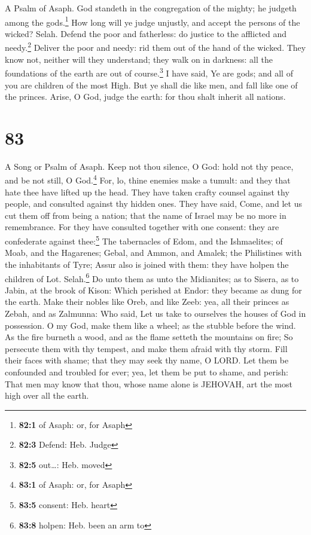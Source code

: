 A Psalm of Asaph.  God standeth in the congregation of the
mighty; he judgeth among the gods.\footnote{\textbf{82:1} of Asaph: or,
  for Asaph}  How long will ye judge unjustly, and accept
the persons of the wicked? Selah.  Defend the poor and
fatherless: do justice to the afflicted and needy.\footnote{\textbf{82:3}
  Defend: Heb. Judge}  Deliver the poor and needy: rid
them out of the hand of the wicked.  They know not,
neither will they understand; they walk on in darkness: all the
foundations of the earth are out of course.\footnote{\textbf{82:5}
  out\ldots: Heb. moved}  I have said, Ye are gods; and
all of you are children of the most High.  But ye shall
die like men, and fall like one of the princes.  Arise, O
God, judge the earth: for thou shalt inherit all nations.

\hypertarget{section-82}{%
\section{83}\label{section-82}}

A Song or Psalm of Asaph.  Keep not thou silence, O God:
hold not thy peace, and be not still, O God.\footnote{\textbf{83:1} of
  Asaph: or, for Asaph}  For, lo, thine enemies make a
tumult: and they that hate thee have lifted up the head. 
They have taken crafty counsel against thy people, and consulted against
thy hidden ones.  They have said, Come, and let us cut
them off from being a nation; that the name of Israel may be no more in
remembrance.  For they have consulted together with one
consent: they are confederate against thee:\footnote{\textbf{83:5}
  consent: Heb. heart}  The tabernacles of Edom, and the
Ishmaelites; of Moab, and the Hagarenes;  Gebal, and
Ammon, and Amalek; the Philistines with the inhabitants of Tyre;
 Assur also is joined with them: they have holpen the
children of Lot. Selah.\footnote{\textbf{83:8} holpen: Heb. been an arm
  to}  Do unto them as unto the Midianites; as to Sisera,
as to Jabin, at the brook of Kison:  Which perished at
Endor: they became as dung for the earth.  Make their
nobles like Oreb, and like Zeeb: yea, all their princes as Zebah, and as
Zalmunna:  Who said, Let us take to ourselves the houses
of God in possession.  O my God, make them like a wheel;
as the stubble before the wind.  As the fire burneth a
wood, and as the flame setteth the mountains on fire;  So
persecute them with thy tempest, and make them afraid with thy storm.
 Fill their faces with shame; that they may seek thy
name, O LORD.  Let them be confounded and troubled for
ever; yea, let them be put to shame, and perish:  That
men may know that thou, whose name alone is JEHOVAH, art the most high
over all the earth.

